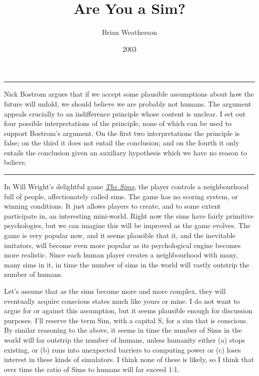 \documentclass[
  10pt,
  letterpaper,
  DIV=11,
  numbers=noendperiod,
  twoside]{scrartcl}
\title{Are You a Sim?}
\author{Brian Weatherson}
\date{2003}
\renewenvironment{abstract}
 {\vspace{-1.25cm}
 \quotation\small\noindent\rule{\linewidth}{.5pt}\par\smallskip
 \noindent }
 {\par\noindent\rule{\linewidth}{.5pt}\endquotation}
\begin{document}
\maketitle
\begin{abstract}
Nick Bostrom argues that if we accept some plausible assumptions about
how the future will unfold, we should believe we are probably not
humans. The argument appeals crucially to an indifference principle
whose content is unclear. I set out four possible interpretations of the
principle, none of which can be used to support Bostrom's argument. On
the first two interpretations the principle is false; on the third it
does not entail the conclusion; and on the fourth it only entails the
conclusion given an auxiliary hypothesis which we have no reason to
believe.
\end{abstract}

In Will Wright's delightful game \href{http://thesims.ea.com/}{\emph{The
Sims}}, the player controls a neighbourhood full of people,
affectionately called sims. The game has no scoring system, or winning
conditions. It just allows players to create, and to some extent
participate in, an interesting mini-world. Right now the sims have
fairly primitive psychologies, but we can imagine this will be improved
as the game evolves. The game is very popular now, and it seems
plausible that it, and the inevitable imitators, will become even more
popular as its psychological engine becomes more realistic. Since each
human player creates a neighbourhood with many, many sims in it, in time
the number of sims in the world will vastly outstrip the number of
humans.

Let's assume that as the sims become more and more complex, they will
eventually acquire conscious states much like yours or mine. I do not
want to argue for or against this assumption, but it seems plausible
enough for discussion purposes. I'll reserve the term Sim, with a
capital S, for a sim that is conscious. By similar reasoning to the
above, it seems in time the number of Sims in the world will far
outstrip the number of humans, unless humanity either (a) stops
existing, or (b) runs into unexpected barriers to computing power or (c)
loses interest in these kinds of simulators. I think none of these is
likely, so I think that over time the ratio of Sims to humans will far
exceed 1:1.
\end{document}
